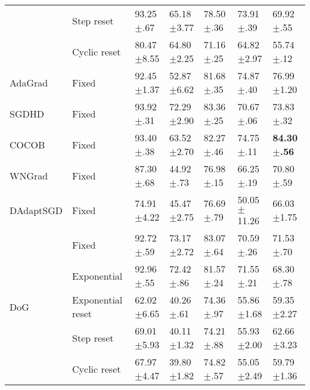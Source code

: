 \begin{tabular}{lllllll}
                             & Step reset        & 93.25$\pm$.67           & 65.18$\pm$3.77          & 78.50$\pm$.36           & 73.91$\pm$.39           & 69.92$\pm$.55           \\
                             & Cyclic reset      & 80.47$\pm$8.55          & 64.80$\pm$2.25          & 71.16$\pm$.25           & 64.82$\pm$2.97          & 55.74$\pm$.12           \\
    AdaGrad                  & Fixed             & 92.45$\pm$1.37          & 52.87$\pm$6.62          & 81.68$\pm$.35           & 74.87$\pm$.40           & 76.99$\pm$1.20          \\
    SGDHD                    & Fixed             & 93.92$\pm$.31           & 72.29$\pm$2.90          & 83.36$\pm$.25           & 70.67$\pm$.06           & 73.83$\pm$.32           \\
    COCOB                    & Fixed             & 93.40$\pm$.38           & 63.52$\pm$2.70          & 82.27$\pm$.46           & 74.75$\pm$.11           & \bfseries 84.30$\pm$.56 \\
    WNGrad                   & Fixed             & 87.30$\pm$.68           & 44.92$\pm$.73           & 76.98$\pm$.15           & 66.25$\pm$.19           & 70.80$\pm$.59           \\
    DAdaptSGD                & Fixed             & 74.91$\pm$4.22          & 45.47$\pm$2.75          & 76.69$\pm$.79           & 50.05$\pm$11.26         & 66.03$\pm$1.75          \\
    \multirow[c]{5}{*}{DoG}  & Fixed             & 92.72$\pm$.59           & 73.17$\pm$2.72          & 83.07$\pm$.64           & 70.59$\pm$.26           & 71.53$\pm$.70           \\
                             & Exponential       & 92.96$\pm$.55           & 72.42$\pm$.86           & 81.57$\pm$.24           & 71.55$\pm$.21           & 68.30$\pm$.78           \\
                             & Exponential reset & 62.02$\pm$6.65          & 40.26$\pm$.61           & 74.36$\pm$.97           & 55.86$\pm$1.68          & 59.35$\pm$2.27          \\
                             & Step reset        & 69.01$\pm$5.93          & 40.11$\pm$1.32          & 74.21$\pm$.88           & 55.93$\pm$2.00          & 62.66$\pm$3.23          \\
                             & Cyclic reset      & 67.97$\pm$4.47          & 39.80$\pm$1.82          & 74.82$\pm$.57           & 55.05$\pm$2.49          & 59.79$\pm$1.36          \\
    \bottomrule
\end{tabular}
